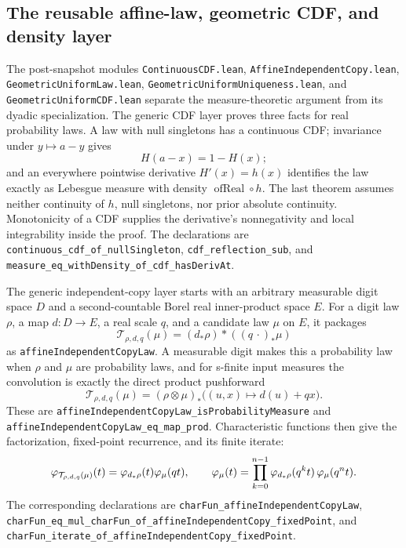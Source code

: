\documentclass[11pt,oneside]{article}
\theoremstyle{definition}
\theoremstyle{remark}
\begin{document}
\subsection{The reusable affine-law, geometric CDF, and density layer}
The post-snapshot modules \nolinkurl{ContinuousCDF.lean},
\nolinkurl{AffineIndependentCopy.lean},
\nolinkurl{GeometricUniformLaw.lean},
\nolinkurl{GeometricUniformUniqueness.lean}, and
\nolinkurl{GeometricUniformCDF.lean} separate the measure-theoretic argument
from its dyadic specialization.  The generic CDF layer proves three facts for
real probability laws.  A law with null singletons has a continuous CDF; invariance
under \(y\mapsto a-y\) gives
\[
  H(a-x)=1-H(x);
\]
and an everywhere pointwise derivative \(H'(x)=h(x)\) identifies the law
exactly as Lebesgue measure with density \(\operatorname{ofReal}\circ h\).
The last theorem assumes neither continuity of \(h\), null singletons, nor
prior absolute continuity.  Monotonicity of a CDF supplies the derivative's
nonnegativity and local integrability inside the proof.  The declarations are
\nolinkurl{continuous_cdf_of_nullSingleton},
\nolinkurl{cdf_reflection_sub}, and
\nolinkurl{measure_eq_withDensity_of_cdf_hasDerivAt}.

The generic independent-copy layer starts with an arbitrary measurable digit
space \(D\) and a second-countable Borel real inner-product space \(E\).  For a
digit law \(\rho\), a map \(d:D\to E\), a real scale \(q\), and a candidate law
\(\mu\) on \(E\), it packages
\[
 \mathcal T_{\rho,d,q}(\mu)
   =(d_*\rho)\mathbin{\ast}((q\,\cdot)_*\mu)
\]
as \nolinkurl{affineIndependentCopyLaw}.  A measurable digit makes this a
probability law when \(\rho\) and \(\mu\) are probability laws, and for s-finite input
measures the convolution is exactly the direct product pushforward
\[
 \mathcal T_{\rho,d,q}(\mu)
   =(\rho\otimes\mu)_*\bigl((u,x)\mapsto d(u)+qx\bigr).
\]
These are
\nolinkurl{affineIndependentCopyLaw_isProbabilityMeasure} and
\nolinkurl{affineIndependentCopyLaw_eq_map_prod}.  Characteristic functions
then give the factorization, fixed-point recurrence, and its finite iterate:
\[
 \varphi_{\mathcal T_{\rho,d,q}(\mu)}(t)
  =\varphi_{d_*\rho}(t)\varphi_{\mu}(qt),\qquad
 \varphi_{\mu}(t)
  =\prod_{k=0}^{n-1}\varphi_{d_*\rho}(q^kt)\,
    \varphi_{\mu}(q^nt).
\]
The corresponding declarations are
\nolinkurl{charFun_affineIndependentCopyLaw},
\nolinkurl{charFun_eq_mul_charFun_of_affineIndependentCopy_fixedPoint}, and
\nolinkurl{charFun_iterate_of_affineIndependentCopy_fixedPoint}.
\end{document}
